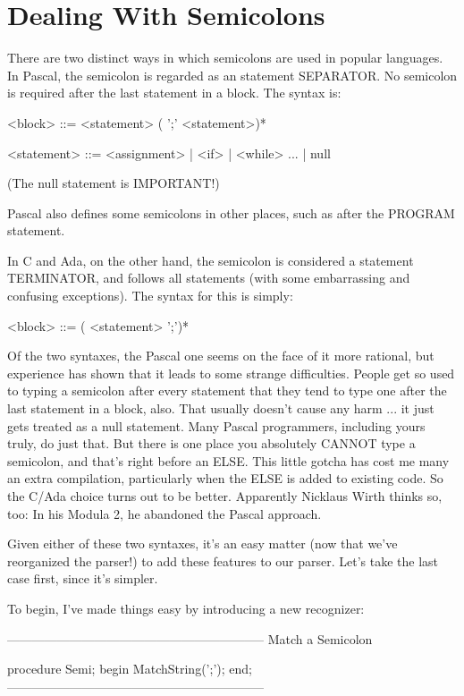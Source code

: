 \documentclass[float=false, crop=false]{standalone}
\begin{document}
\section{Dealing With Semicolons}

There are two distinct ways in which semicolons are used in popular languages.
In Pascal, the semicolon is regarded as an statement SEPARATOR. No semicolon is
required after the last statement in a block. The syntax is:


     <block> ::= <statement> ( ';' <statement>)*

     <statement> ::= <assignment> | <if> | <while> ... | null


(The null statement is IMPORTANT!)

Pascal also defines some semicolons in other places, such as after the PROGRAM
statement.

In C and Ada, on the other hand, the semicolon is considered a statement
TERMINATOR, and follows all statements (with some embarrassing and confusing
exceptions). The syntax for this is simply:


     <block> ::= ( <statement> ';')*


Of the two syntaxes, the Pascal one seems on the face of it more rational, but
experience has shown that it leads to some strange difficulties. People get so
used to typing a semicolon after every statement that they tend to type one
after the last statement in a block, also. That usually doesn't cause any harm
... it just gets treated as a null statement. Many Pascal programmers, including
yours truly, do just that. But there is one place you absolutely CANNOT type a
semicolon, and that's right before an ELSE. This little gotcha has cost me many
an extra compilation, particularly when the ELSE is added to existing code. So
the C/Ada choice turns out to be better. Apparently Nicklaus Wirth thinks so,
too: In his Modula 2, he abandoned the Pascal approach.

Given either of these two syntaxes, it's an easy matter (now that we've
reorganized the parser!) to add these features to our parser. Let's take the
last case first, since it's simpler.

To begin, I've made things easy by introducing a new recognizer:

\begin{code}
{--------------------------------------------------------------}
{ Match a Semicolon }

procedure Semi;
begin
   MatchString(';');
end;
{--------------------------------------------------------------}
\end{code}
\end{document}
